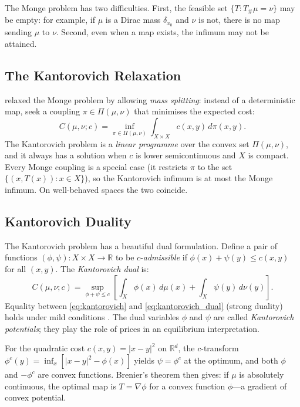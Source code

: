 \documentclass[12pt]{article}
\newcommand{\R}{\mathbb{R}}
\begin{document}
The Monge problem has two difficulties.  First, the feasible set
$\{T: T_\#\mu = \nu\}$ may be empty: for example, if $\mu$ is a
Dirac mass $\delta_{x_0}$ and $\nu$ is not, there is no map
sending $\mu$ to $\nu$.  Second, even when a map exists, the
infimum may not be attained.

\subsection{The Kantorovich Relaxation}

\citet{Kantorovich1942} relaxed the Monge problem by allowing
\emph{mass splitting}: instead of a deterministic map, seek a
coupling $\pi \in \Pi(\mu,\nu)$ that minimises the expected
cost:
\begin{equation}\label{eq:kantorovich}
  \boxed{C(\mu,\nu; c)
  = \inf_{\pi \in \Pi(\mu,\nu)}
  \int_{X\times X} c(x,y)\,d\pi(x,y).}
\end{equation}
The Kantorovich problem is a \emph{linear programme} over the
convex set $\Pi(\mu,\nu)$, and it always has a solution when
$c$ is lower semicontinuous and $X$ is compact.  Every Monge
coupling is a special case (it restricts $\pi$ to the set
$\{(x,T(x)): x \in X\}$), so the Kantorovich infimum is at
most the Monge infimum.  On well-behaved spaces the two
coincide.

\subsection{Kantorovich Duality}

The Kantorovich problem has a beautiful dual formulation.
Define a pair of functions $(\phi, \psi): X \times X \to \R$
to be $c$-\emph{admissible} if
$\phi(x) + \psi(y) \leq c(x,y)$ for all $(x,y)$.
The \emph{Kantorovich dual} is:
\begin{equation}\label{eq:kantorovich_dual}
  C(\mu,\nu; c)
  = \sup_{\phi + \psi \leq c}
  \left[\int_X \phi(x)\,d\mu(x) + \int_X \psi(y)\,d\nu(y)\right].
\end{equation}
Equality between \eqref{eq:kantorovich} and
\eqref{eq:kantorovich_dual} (strong duality) holds under mild
conditions \citep{Villani2009}.  The dual variables $\phi$ and
$\psi$ are called \emph{Kantorovich potentials}; they play the
role of prices in an equilibrium interpretation.

For the quadratic cost $c(x,y) = |x-y|^2$ on $\R^d$, the
$c$-transform $\phi^c(y) = \inf_{x}[|x-y|^2 - \phi(x)]$
yields $\psi = \phi^c$ at the optimum, and both $\phi$ and
$-\phi^c$ are convex functions.  Brenier's theorem
\citep{Brenier1991} then gives: if $\mu$ is absolutely
continuous, the optimal map is $T = \nabla\phi$ for a convex
function $\phi$---a gradient of convex potential.
\end{document}
